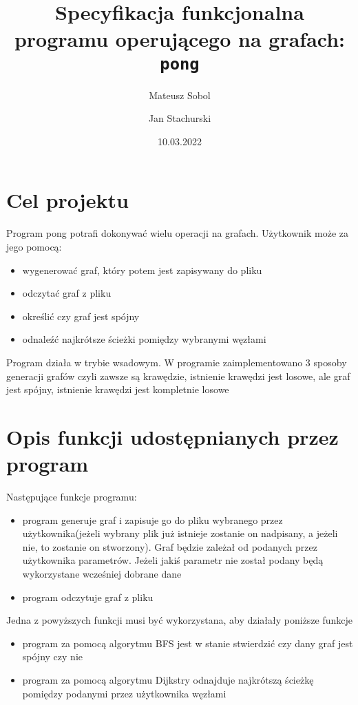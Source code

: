 \documentclass[12pt]{article}
\begin{document}
\title{Specyfikacja funkcjonalna programu operującego na grafach: \texttt{pong}}
\author{Mateusz Sobol \and Jan Stachurski}
\date{10.03.2022}
\maketitle
\renewcommand{\contentsname}{Spis treści}
\tableofcontents
\cleardoublepage
\section{Cel projektu}\label{header-n231}

Program pong potrafi dokonywać wielu operacji na grafach. Użytkownik może za jego pomocą:
\begin{itemize}
\item
wygenerować graf, który potem jest zapisywany do pliku
\item
odczytać graf z pliku
\item
określić czy graf jest spójny
\item
odnaleźć najkrótsze ścieżki pomiędzy wybranymi węzłami
\end{itemize}
Program działa w trybie wsadowym. W programie zaimplementowano 3 sposoby generacji grafów czyli zawsze są krawędzie, istnienie krawędzi jest losowe, ale graf jest spójny, istnienie krawędzi jest kompletnie losowe


\section{Opis funkcji udostępnianych przez program }\label{header-n233}

Następujące funkcje programu:
\begin{itemize}
\item
program generuje graf i zapisuje go do pliku wybranego przez użytkownika(jeżeli wybrany plik już istnieje zostanie on nadpisany, a jeżeli nie, to zostanie on stworzony). Graf będzie zależał od podanych przez użytkownika parametrów. Jeżeli jakiś parametr nie został podany będą wykorzystane wcześniej dobrane dane
\item
program odczytuje graf z pliku  
\end{itemize}
Jedna z powyższych funkcji musi być wykorzystana, aby działały poniższe funkcje 
\begin{itemize}
\item
program za pomocą algorytmu BFS jest w stanie stwierdzić czy dany graf jest spójny czy nie
\item
program za pomocą algorytmu Dijkstry odnajduje najkrótszą ścieżkę pomiędzy podanymi przez użytkownika węzłami
\end{itemize}
\end{document}
